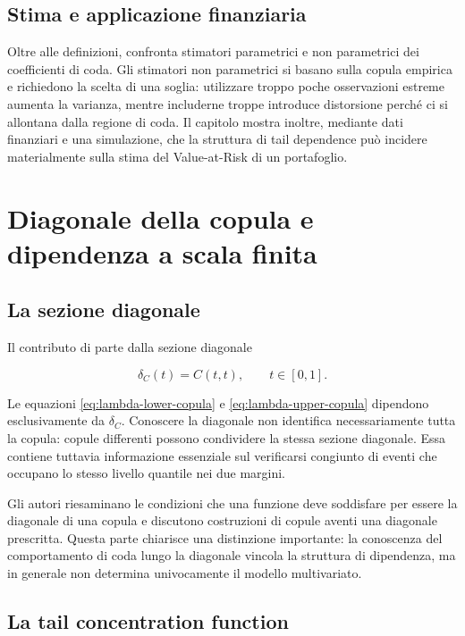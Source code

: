 \subsection{Stima e applicazione finanziaria}

Oltre alle definizioni, \textcite{schmidt2005} confronta stimatori parametrici
e non parametrici dei coefficienti di coda. Gli stimatori non parametrici si
basano sulla copula empirica e richiedono la scelta di una soglia: utilizzare
troppo poche osservazioni estreme aumenta la varianza, mentre includerne troppe
introduce distorsione perché ci si allontana dalla regione di coda. Il capitolo
mostra inoltre, mediante dati finanziari e una simulazione, che la struttura di
tail dependence può incidere materialmente sulla stima del Value-at-Risk di un
portafoglio.

\section{Diagonale della copula e dipendenza a scala finita}

\subsection{La sezione diagonale}

Il contributo di \textcite{duranteEtAl2015} parte dalla sezione diagonale

\begin{equation}
    \delta_C(t)=C(t,t), \qquad t\in[0,1].
    \label{eq:diagonal-section}
\end{equation}

Le equazioni \eqref{eq:lambda-lower-copula} e
\eqref{eq:lambda-upper-copula} dipendono esclusivamente da
$\delta_C$. Conoscere la diagonale non identifica necessariamente tutta la
copula: copule differenti possono condividere la stessa sezione diagonale.
Essa contiene tuttavia informazione essenziale sul verificarsi congiunto di
eventi che occupano lo stesso livello quantile nei due margini.

Gli autori riesaminano le condizioni che una funzione deve soddisfare per
essere la diagonale di una copula e discutono costruzioni di copule aventi una
diagonale prescritta. Questa parte chiarisce una distinzione importante: la
conoscenza del comportamento di coda lungo la diagonale vincola la struttura
di dipendenza, ma in generale non determina univocamente il modello
multivariato.

\subsection{La tail concentration function}

